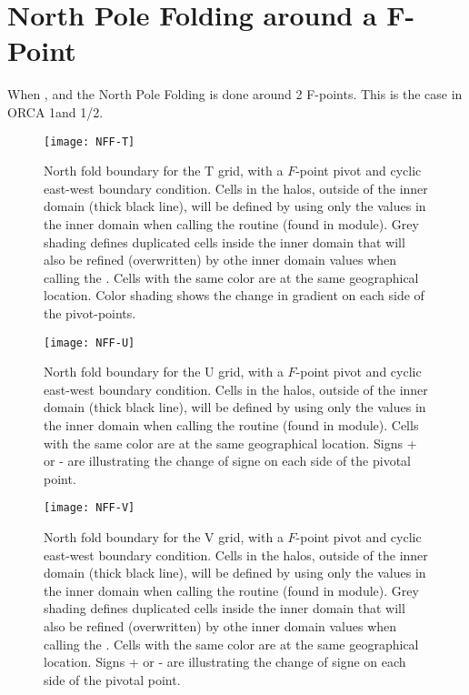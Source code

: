 \documentclass[../main/NEMO_manual]{subfiles}
\begin{document}
\section[North Pole Folding around a F-Point]{North Pole Folding around a F-Point}

When ,  and  the North Pole Folding is done around 2 F-points. This is the case in ORCA 1\deg and 1/2\deg.


\begin{figure}[h]
  \centering
  \texttt{[image: NFF-T]}
  \caption{
    North fold boundary for the T grid, with a $F$-point pivot and cyclic east-west boundary condition.
    Cells in the halos, outside of the inner domain (thick black line), will be defined by using only the values in the inner domain when calling the  routine (found in  module). Grey shading defines duplicated cells inside the inner domain that will also be refined (overwritten) by othe inner domain values when calling the .
    Cells with the same color are at the same geographical location. Color shading shows the change in gradient on each side of the pivot-points.}
  \label{fig:NFF-T}
\end{figure}

\begin{figure}[t]
  \centering
  \texttt{[image: NFF-U]}
  \caption{
    North fold boundary for the U grid, with a $F$-point pivot and cyclic east-west boundary condition.
    Cells in the halos, outside of the inner domain (thick black line), will be defined by using only the values in the inner domain when calling the  routine (found in  module).
    Cells with the same color are at the same geographical location. Signs + or - are illustrating the change of signe on each side of the pivotal point.}
  \label{fig:NFF-U}
\end{figure}

\begin{figure}[t]
  \centering
  \texttt{[image: NFF-V]}
  \caption{
    North fold boundary for the V grid, with a $F$-point pivot and cyclic east-west boundary condition.
    Cells in the halos, outside of the inner domain (thick black line), will be defined by using only the values in the inner domain when calling the  routine (found in  module). Grey shading defines duplicated cells inside the inner domain that will also be refined (overwritten) by othe inner domain values when calling the .
    Cells with the same color are at the same geographical location. Signs + or - are illustrating the change of signe on each side of the pivotal point.}
  \label{fig:NFF-V}
\end{figure}
\end{document}
